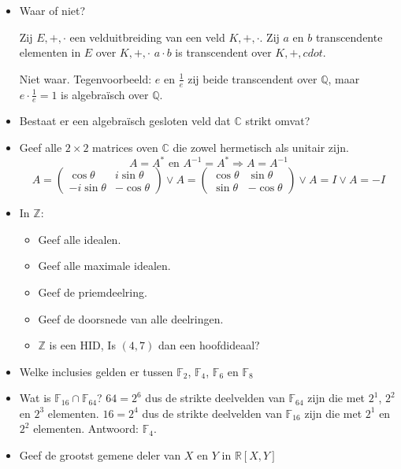 \documentclass[main.tex]{subfiles}
\begin{document}
\begin{itemize}
\begin{center}
  \end{center}
\item Waar of niet?
  \begin{center}
    Zij $E,+,\cdot$ een velduitbreiding van een veld $K,+,\cdot$. 
    Zij $a$ en $b$ transcendente elementen in $E$ over $K,+,\cdot$
    $a\cdot b$ is transcendent over $K,+,cdot$.
  \end{center}
  Niet waar. Tegenvoorbeeld: $e$ en $\frac{1}{e}$ zij beide transcendent over $\mathbb{Q}$, maar $e \cdot \frac{1}{e}=1$ is algebra\"isch over $\mathbb{Q}$.
\item Bestaat er een algebra\"isch gesloten veld dat $\mathbb{C}$ strikt omvat?
\item Geef alle $2\times 2$ matrices oven $\mathbb{C}$ die zowel hermetisch als unitair zijn.
\[ A = A^{*} \text{ en } A^{-1}=A^{*} \Rightarrow A=A^{-1}\]
\[ A = 
\begin{pmatrix}
  \cos\theta & i\sin\theta\\
  -i\sin\theta & -\cos\theta
\end{pmatrix}
\vee 
A =
\begin{pmatrix}
  \cos\theta & \sin\theta\\
  \sin\theta & -\cos\theta
\end{pmatrix}
\vee 
A = I
\vee 
A = -I
\]
\item In $\mathbb{Z}$:
  \begin{itemize}
  \item Geef alle idealen.
  \item Geef alle maximale idealen.
  \item Geef de priemdeelring.
  \item Geef de doorsnede van alle deelringen.
  \item $\mathbb{Z}$ is een HID, Is $(4,7)$ dan een hoofdideaal? 
  \end{itemize}
\item Welke inclusies gelden er tussen $\mathbb{F}_{2}$, $\mathbb{F}_{4}$, $\mathbb{F}_{6}$ en $\mathbb{F}_{8}$
\item Wat is $\mathbb{F}_{16}\cap \mathbb{F}_{64}$?
$64=2^{6}$ dus de strikte deelvelden van $\mathbb{F}_{64}$ zijn die met $2^{1}$, $2^{2}$ en $2^{3}$ elementen.
$16=2^{4}$ dus de strikte deelvelden van $\mathbb{F}_{16}$ zijn die met $2^{1}$ en $2^{2}$ elementen.
Antwoord: $\mathbb{F}_{4}$.
\item Geef de grootst gemene deler van $X$ en $Y$ in $\mathbb{R}[X,Y]$

\end{itemize}
\end{document}
